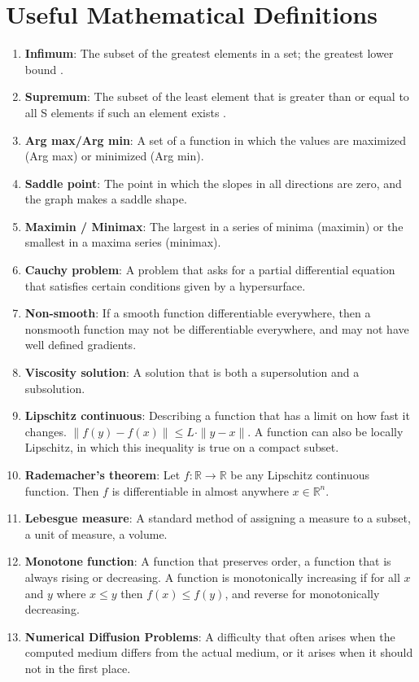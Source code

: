 \documentclass[11pt]{amsart}
\begin{document}
\section{Useful Mathematical Definitions}\label{mathdefs}
\begin{enumerate}
    \item\label{math:infimum} \textbf{Infimum}: The subset of the greatest elements in a set; the greatest lower bound \cite{infimumsupremum}.
    \item\label{math:supremum} \textbf{Supremum}: The subset of the least element that is greater than or equal to all S elements if such an element exists  \cite{infimumsupremum}.
    \item\label{math:Argmaxmin} \textbf{Arg max/Arg min}: A set of a function in which the values are maximized (Arg max) or minimized (Arg min).
    \item\label{math:saddlepoint} \textbf{Saddle point}: The point in which the slopes in all directions are zero, and the graph makes a saddle shape.
    \item\label{math:maximinminimax} \textbf{Maximin / Minimax}: The largest in a series of minima (maximin) or the smallest in a maxima series (minimax).
    \item\label{math:cauchyproblem} \textbf{Cauchy problem}: A problem that asks for a partial differential equation that satisfies certain conditions given by a hypersurface.
    \item\label{math:nonsmooth} \textbf{Non-smooth}: If a smooth function differentiable everywhere, then a nonsmooth function may not be differentiable everywhere, and may not have well defined gradients. 
    \item\label{math:viscosity} \textbf{Viscosity solution}: A solution that is both a supersolution and a subsolution.
    \item\label{math:lipschitz} \textbf{Lipschitz continuous}: Describing a function that has a limit on how fast it changes. $\|f(y)-f(x)\| \leq L \cdot \|y-x\|$. A function can also be locally Lipschitz, in which this inequality is true on a compact subset.
    \item\label{math:rademacher} \textbf{Rademacher's theorem}: Let $f: \mathbb{R} \rightarrow \mathbb{R} $ be any Lipschitz continuous function. Then $f$ is differentiable in almost anywhere $x \in \mathbb{R}^n$.
    \item\label{math:lebesgue} \textbf{Lebesgue measure}: A standard method of assigning a measure to a subset, a unit of measure, a volume. 
    \item\label{math:monotone} \textbf{Monotone function}: A function that preserves order, a function that is always rising or decreasing. A function is monotonically increasing if for all $x$ and $y$ where $x \leq y$ then $f(x) \leq f(y)$, and reverse for monotonically decreasing.
    \item\label{math:diffusionproblem} \textbf{Numerical Diffusion Problems}: A difficulty that often arises when the computed medium differs from the actual medium, or it arises when it should not in the first place.
\end{enumerate}
\end{document}
